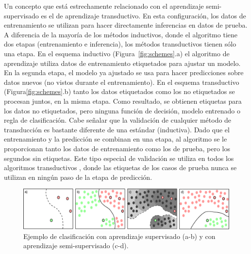 
Un concepto que está estrechamente relacionado con el aprendizaje semi-supervisado es el de aprendizaje transductivo. En esta configuración, los datos de
entrenamiento se utilizan para hacer directamente inferencias en datos de prueba. A diferencia de la mayoría de los métodos inductivos, donde el algoritmo
tiene dos etapas (entrenamiento e inferencia), los métodos transductivos tienen sólo una etapa. En el esquema inductivo (Figura~\ref{fig:schemes}.a) el algoritmo
de aprendizaje utiliza datos de entrenamiento etiquetados para ajustar un modelo. En la segunda etapa, el modelo ya ajustado se usa para hacer predicciones
sobre datos nuevos (no vistos durante el entrenamiento). En el esquema transductivo (Figura\ref{fig:schemes}.b) tanto los datos etiquetados como los no
etiquetados se procesan juntos, en la misma etapa. Como resultado, se obtienen etiquetas para los datos no etiquetados, pero ninguna función de decisión, modelo
entrenado o regla de clasificación. Cabe señalar que la validación de cualquier método de transducción es bastante diferente de una estándar (inductiva). Dado
que el entrenamiento y la predicción se combinan en una etapa, al algoritmo se le proporcionan tanto los datos de entrenamiento como los de prueba, pero los
segundos sin etiquetas.  Este tipo especial de validación se utiliza en todos los algoritmos transductivos \citep{chapelle2006semi}, donde las etiquetas de los
casos de prueba nunca se
utilizan en ningún paso de la etapa de predicción.

\begin{figure}[tpb] \centering
	\includegraphics[width=\textwidth]{fig/semivssuperv.eps}
	\caption[Aprendizaje semi-supervisado vs supervisado]{Ejemplo de clasificación con aprendizaje supervisado (a-b) y con aprendizaje semi-supervisado (c-d).}
	\label{fig:semivssuperv}
\end{figure}

